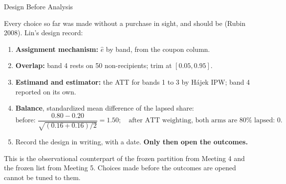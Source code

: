 \documentclass[aspectratio=169, 11pt, handout]{beamer}
\begin{document}
\begin{frame}{Design Before Analysis}

Every choice so far was made without a purchase in sight, and should be (Rubin 2008). Lin's design record:

\begin{enumerate}
  \item \textbf{Assignment mechanism:} $\hat e$ by band, from the coupon column.
  \item \textbf{Overlap:} band 4 rests on 50 non-recipients; trim at $[0.05, 0.95]$.
  \item \textbf{Estimand and estimator:} the ATT for bands 1 to 3 by H\'ajek IPW; band 4 reported on its own.
  \item \textbf{Balance}, standardized mean difference of the lapsed share:
  \[
  \text{before: } \frac{0.80 - 0.20}{\sqrt{(0.16 + 0.16)/2}} = 1.50; \quad \text{after ATT weighting, both arms are } 80\% \text{ lapsed: } 0 .
  \]
  \item Record the design in writing, with a date. \textbf{Only then open the outcomes.}
\end{enumerate}

\medskip

This is the observational counterpart of the frozen partition from Meeting 4 and the frozen list from Meeting 5. Choices made before the outcomes are opened cannot be tuned to them.
\end{frame}
\end{document}
